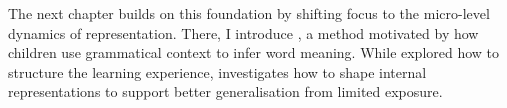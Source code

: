 The next chapter builds on this foundation by shifting focus to the micro-level dynamics of representation. There, I introduce \smoothing, a method motivated by how children use grammatical context to infer word meaning. While \climb explored how to structure the learning experience, \smoothing investigates how to shape internal representations to support better generalisation from limited exposure.





